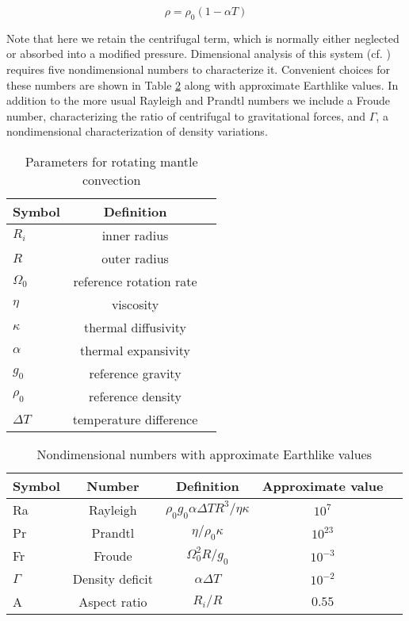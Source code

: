 \documentclass[extra]{gji}
\begin{document}
\begin{equation}
\rho = \rho_0 \left( 1 - \alpha T \right)
\label{eos}
\end{equation}

Note that here we retain the centrifugal term, which is normally either neglected or absorbed into a modified pressure. 
Dimensional analysis of this system (cf. \citet{barenblatt1996scaling}) requires five nondimensional numbers to characterize it.
Convenient choices for these numbers are shown in Table \ref{nondim} along with approximate Earthlike values.
In addition to the more usual Rayleigh and Prandtl numbers we include a Froude number, characterizing the ratio of centrifugal to gravitational forces, and $\Gamma$, a nondimensional characterization of density variations.

\begin{table}
\caption{Parameters for rotating mantle convection}
\label{parameters}
\begin{tabular}{@{}lcc}
Symbol & Definition\\
\hline
$R_i$ & inner radius \\
$R$ & outer radius \\
$\Omega_0$ & reference rotation rate \\
$\eta$ & viscosity \\
$\kappa$ & thermal diffusivity \\
$\alpha$ & thermal expansivity \\
$g_0$ & reference gravity \\
$\rho_0$ & reference density \\
$\Delta T$ & temperature difference \\ 
\end{tabular}
\end{table}

\begin{table}
\caption{Nondimensional numbers with approximate Earthlike values}
\label{nondim}
\begin{tabular}{@{}lcccc}
Symbol &  Number & Definition & Approximate value \\
\hline
Ra & Rayleigh &  $\rho_0 g_0 \alpha \Delta T R^3/\eta \kappa$ & $10^7$\\
Pr & Prandtl & $\eta/\rho_0 \kappa$ & $10^{23}$ \\
Fr & Froude & $\Omega_0^2 R/g_0$ & $10^{-3}$ \\
$\Gamma$ & Density deficit & $\alpha \Delta T$ & $10^{-2}$ \\
A & Aspect ratio & $R_i/R$ & $0.55$ \\
\end{tabular}
\end{table}
 
\end{document}
